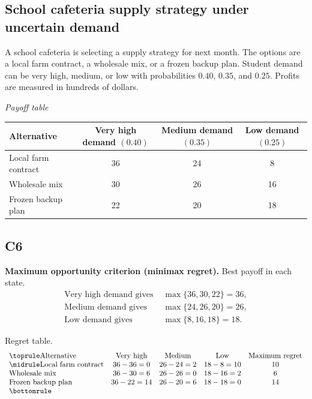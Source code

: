 	\begin{ExamProblems}
		\item
		\section{School cafeteria supply strategy under uncertain demand}
		A school cafeteria is selecting a supply strategy for next month. The options are a local farm contract, a wholesale mix, or a frozen backup plan. Student demand can be very high, medium, or low with probabilities $0.40$, $0.35$, and $0.25$. Profits are measured in hundreds of dollars.

		\begin{center}
			\textit{Payoff table}\\
			\begin{tabular}{l c c c}
				\toprule
				Alternative & Very high demand $(0.40)$ & Medium demand $(0.35)$ & Low demand $(0.25)$ \\
				\midrule
				Local farm contract & 36 & 24 & 8 \\
				Wholesale mix & 30 & 26 & 16 \\
				Frozen backup plan & 22 & 20 & 18 \\
				\bottomrule
			\end{tabular}
		\end{center}

		\subsection*{C6}
		\textbf{Maximum opportunity criterion (minimax regret).} Best payoff in each state.
		\[
		\begin{aligned}
		\text{Very high demand gives } &\max\{36,30,22\}=36,\\
		\text{Medium demand gives } &\max\{24,26,20\}=26,\\
		\text{Low demand gives } &\max\{8,16,18\}=18.
		\end{aligned}
		\]

		Regret table.
		\[
		\begin{array}{lcccc}
			\toprule
			\text{Alternative} & \text{Very high} & \text{Medium} & \text{Low} & \text{Maximum regret}\\
			\midrule
			\text{Local farm contract} & 36-36=0 & 26-24=2 & 18-8=10 & 10\\
			\text{Wholesale mix} & 36-30=6 & 26-26=0 & 18-16=2 & 6\\
			\text{Frozen backup plan} & 36-22=14 & 26-20=6 & 18-18=0 & 14\\
			\bottomrule
		\end{array}
		\]


\end{ExamProblems}

